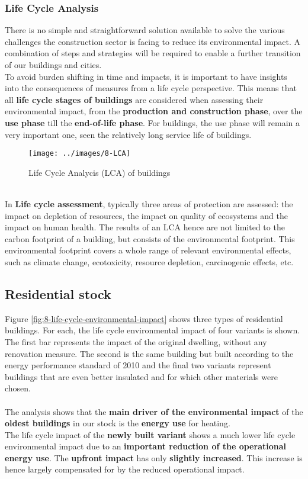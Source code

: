\documentclass[../summary.tex]{subfiles}
\begin{document}
	\subsubsection{Life Cycle Analysis}
	
	There is no simple and straightforward solution available to solve the various challenges the construction sector is facing to reduce its environmental impact. A combination of steps and strategies will be required to enable a further transition of our buildings and cities.
	\\
	To avoid burden shifting in time and impacts, it is important to have insights into the consequences of measures from a life cycle perspective. This means that all \textbf{life cycle stages of buildings} are considered when assessing their environmental impact, from the \textbf{production and construction phase}, over the \textbf{use phase} till the \textbf{end-of-life phase}. For buildings, the use phase will remain a very important one, seen the relatively long service life of buildings.
	
	\begin{figure}[H]
		\centering
		\texttt{[image: ../images/8-LCA]}
		\caption{Life Cycle Analycis (LCA) of buildings}
		\label{fig:8-lca}
	\end{figure}
	
	\ \\
	In \textbf{Life cycle assessment}, typically three areas of protection are assessed: the impact on depletion of resources, the impact on quality of ecosystems and the impact on human health. The results of an LCA hence are not limited to the carbon footprint of a building, but consists of the environmental footprint. This environmental footprint covers a whole range of relevant environmental effects, such as climate change, ecotoxicity, resource depletion, carcinogenic effects, etc.
	
	
	
	\subsection{Residential stock}
	
	Figure \ref{fig:8-life-cycle-environmental-impact} shows three types of residential buildings. For each,  the life cycle environmental impact of four variants is shown. The first bar represents the impact of the original dwelling, without any renovation measure. The second is the same building but built according to the energy performance standard of 2010 and the final two variants represent buildings that are even better insulated and for which other materials were chosen.\\
	\\
	The analysis shows that the \textbf{main driver of the environmental impact} of the \textbf{oldest buildings} in our stock is the \textbf{energy use} for heating.\\
	The life cycle impact of the \textbf{newly built variant} shows a much lower life cycle environmental impact due to an \textbf{important reduction of the operational energy use}. The \textbf{upfront impact} has only \textbf{slightly increased}. This increase is hence largely compensated for by the reduced operational impact.
	
\end{document}
